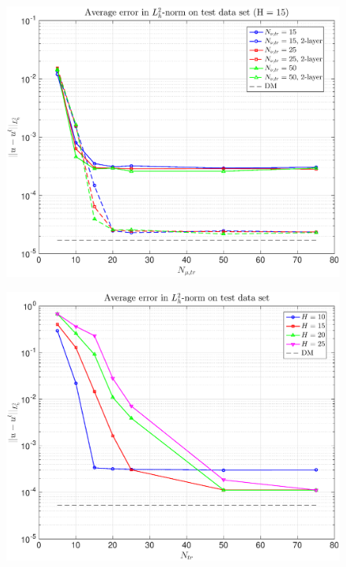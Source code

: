 \documentclass[11pt,a4paper]{article}
\theoremstyle{definition}
\theoremstyle{theorem}
\numberwithin{equation}{section}
\begin{document}
	\begin{figure}[H]
		\center
		\includegraphics[scale = 0.5]{fig5}
		\caption{}
	\end{figure}
	
	\begin{figure}[H]
		\center
		\includegraphics[scale = 0.5]{fig6}
		\caption{}
	\end{figure}
	
\end{document}
